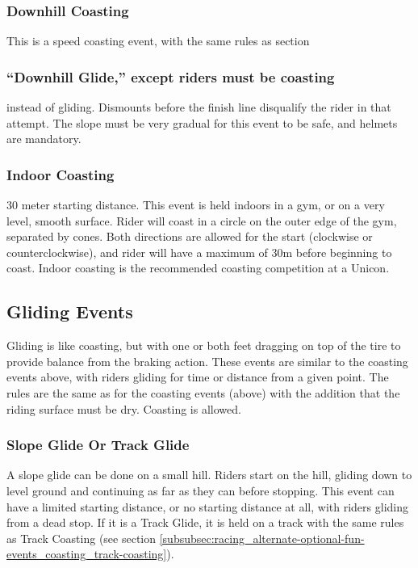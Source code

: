 \subsubsection{Downhill Coasting}
This is a speed coasting event, with the same rules as section 
\subsubsection{``Downhill Glide,'' except riders must be coasting}
instead of gliding.
Dismounts before the finish line disqualify the rider in that attempt.
The slope must be very gradual for this event to be safe, and helmets are mandatory.

\subsubsection{Indoor Coasting}
30 meter starting distance.
This event is held indoors in a gym, or on a very level, smooth surface.
Rider will coast in a circle on the outer edge of the gym, separated by cones.
Both directions are allowed for the start (clockwise or counterclockwise), and rider will have a maximum of 30m before beginning to coast.
Indoor coasting is the recommended coasting competition at a Unicon.

\subsection{Gliding Events}
Gliding is like coasting, but with one or both feet dragging on top of the tire to provide balance from the braking action.
These events are similar to the coasting events above, with riders gliding for time or distance from a given point.
The rules are the same as for the coasting events (above) with the addition that the riding surface must be dry.
Coasting is allowed.

\subsubsection{Slope Glide Or Track Glide}
A slope glide can be done on a small hill.
Riders start on the hill, gliding down to level ground and continuing as far as they can before stopping.
This event can have a limited starting distance, or no starting distance at all, with riders gliding from a dead stop.
If it is a Track Glide, it is held on a track with the same rules as Track Coasting (see section \ref{subsubsec:racing_alternate-optional-fun-events_coasting_track-coasting}).

